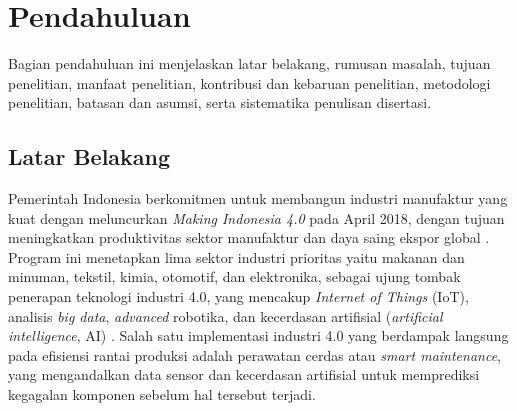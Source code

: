 
\chapter{Pendahuluan}
\label{bab:pendahuluan}

Bagian pendahuluan ini menjelaskan latar belakang, rumusan
masalah, tujuan penelitian, {\color{blue}manfaat penelitian,} kontribusi dan kebaruan penelitian, {\color{blue}metodologi penelitian, batasan dan asumsi, serta sistematika
penulisan disertasi}.


\section{Latar Belakang}
\label{sec:bab1_latar}

Pemerintah Indonesia  berkomitmen untuk membangun industri manufaktur
yang kuat dengan meluncurkan \emph{Making Indonesia 4.0} pada April 2018,
dengan tujuan meningkatkan produktivitas sektor manufaktur dan daya saing
ekspor global .
Program ini menetapkan lima sektor industri prioritas yaitu makanan dan minuman,
tekstil, kimia, otomotif, dan elektronika, sebagai ujung tombak penerapan
teknologi industri 4.0, yang mencakup \emph{Internet of Things} (IoT),
analisis \emph{big data}, \emph{advanced }robotika, dan kecerdasan artifisial
(\emph{artificial intelligence}, AI) .
Salah satu implementasi industri 4.0 yang berdampak langsung pada efisiensi
rantai produksi adalah perawatan cerdas atau \emph{smart maintenance},
yang mengandalkan data sensor dan kecerdasan artifisial untuk memprediksi
kegagalan komponen sebelum hal tersebut terjadi.


